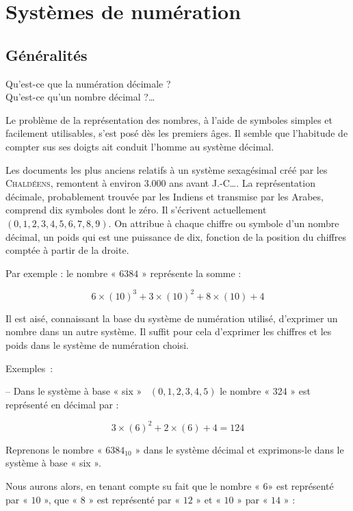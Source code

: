 \ifdefined\COMPLETE
\else
    
    
\fi
\chapter{Systèmes de numération}

\section{Généralités}

Qu'est-ce que la numération décimale ? \\
Qu'est-ce qu'un nombre décimal ?\ldots 

Le problème de la représentation des nombres, à l'aide de symboles simples et facilement utilisables, s'est posé dès les premiers âges. Il semble que l'habitude de compter sus ses doigts ait conduit l'homme au système décimal. 

Les documents les plus anciens relatifs à un système sexagésimal créé par les \textsc{Chaldéens}, remontent à environ 3.000 ans avant \textsc{J.-C}\ldots. La représentation décimale, probablement trouvée par les Indiens et transmise par les Arabes, comprend dix symboles dont le zéro. Il s'écrivent actuellement $(0, 1, 2, 3, 4, 5, 6, 7, 8, 9)$. On attribue à chaque chiffre ou symbole d'un nombre décimal, un poids qui est une puissance de dix, fonction de la position du chiffres comptée à partir de la droite. 

Par exemple : le nombre « $6384$ » représente la somme :

\[ 6 \times (10)^3 + 3 \times (10)^2 + 8 \times (10) + 4 \] 

Il est aisé, connaissant la base du système de numération utilisé,
d'exprimer un nombre dans un autre système. Il suffit pour cela d'exprimer
les chiffres et les poids dans le système de numération choisi.

Exemples~:

-- Dans le système à base « six » ~$(0,1,2,3,4,5)$ le nombre « 324 » est
représenté en décimal par :

\[ 3\times(6)^{2}+2\times(6)+4=124 \]

Reprenons le nombre « $6384_{10}$ » dans le système décimal et exprimons-le dans le système à base « six ». 

Nous aurons alors, en tenant compte su fait que le nombre « $6$» est représenté par « $10$ », que « $8$ » est représenté par « $12$ » et « $10$ » par « $14$ » :

